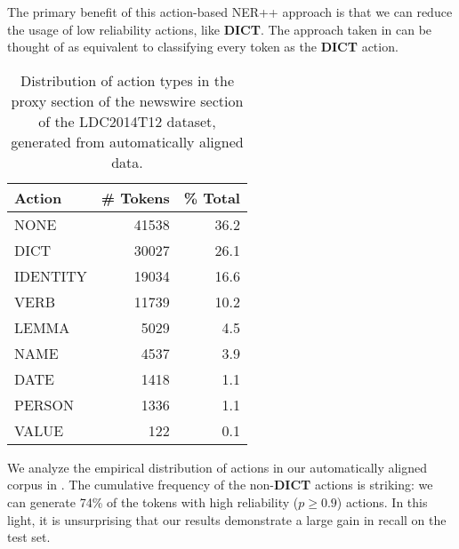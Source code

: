 \documentclass[11pt]{article}
\begin{document}

The primary benefit of this action-based NER++ approach is that we can reduce the 
usage of low reliability actions, like \textbf{DICT}. 
The approach taken in  can be thought of as
equivalent to classifying every token as the \textbf{DICT} action.

%
%

\begin{table}[t]
\begin{center}
\begin{tabular}{l|rr}
\bf Action & \bf \# Tokens & \bf \% Total \\ \hline
NONE & 41538 & 36.2 \\
DICT & 30027 & 26.1 \\
IDENTITY & 19034 & 16.6 \\
VERB & 11739 & 10.2 \\
LEMMA & 5029 & 4.5 \\
NAME & 4537 & 3.9 \\
DATE & 1418 & 1.1 \\
PERSON & 1336 & 1.1 \\
VALUE & 122  & 0.1\\
\end{tabular}
\end{center}
\caption{\label{tab:distro} Distribution of action types in the proxy section of the newswire section of the LDC2014T12 dataset, generated from automatically aligned data. }
\end{table}

We analyze the empirical distribution of actions in our automatically aligned corpus in .
The cumulative frequency of the non-\textbf{DICT} actions is striking: we can generate 74\% of the tokens with high reliability ($p \geq 0.9$) actions.
In this light, it is unsurprising that our results demonstrate a large gain in recall on the test set.

\end{document}
